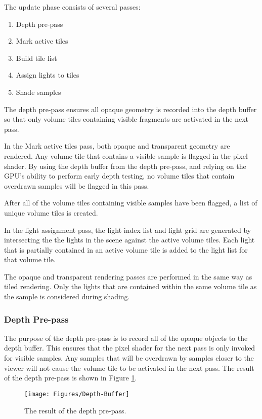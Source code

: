 The update phase consists of several passes:

\begin{enumerate}
\item{Depth pre-pass}
\item{Mark active tiles}
\item{Build tile list}
\item{Assign lights to tiles}
\item{Shade samples}
\end{enumerate}

The depth pre-pass ensures all opaque geometry is recorded into the depth buffer so that only volume tiles containing visible fragments are activated in the next pass.

In the Mark active tiles pass, both opaque and transparent geometry are rendered. Any volume tile that contains a visible sample is flagged in the pixel shader. By using the depth buffer from the depth pre-pass, and relying on the GPU's ability to perform early depth testing, no volume tiles that contain overdrawn samples will be flagged in this pass.

After all of the volume tiles containing visible samples have been flagged, a list of unique volume tiles is created.

In the light assignment pass, the light index list and light grid are generated by intersecting the the lights in the scene against the active volume tiles. Each light that is partially contained in an active volume tile is added to the light list for that volume tile.

The opaque and transparent rendering passes are performed in the same way as tiled rendering. Only the lights that are contained within the same volume tile as the sample is considered during shading.

\subsubsection{Depth Pre-pass}

The purpose of the depth pre-pass is to record all of the opaque objects to the depth buffer. This ensures that the pixel shader for the next pass is only invoked for visible samples. Any samples that will be overdrawn by samples closer to the viewer will not cause the volume tile to be activated in the next pass. The result of the depth pre-pass is shown in Figure \ref{fig:Depth-Buffer}.

\begin{figure}[h]
\centering
\texttt{[image: Figures/Depth-Buffer]}
\decoRule
\caption{The result of the depth pre-pass.}
\label{fig:Depth-Buffer}
\end{figure}

